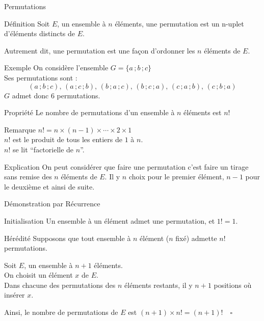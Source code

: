 \documentclass{cours}
\begin{document}
    \begin{Gpartie}{Permutations}
        \begin{Spartie}{Définition}
            Soit $E$, un ensemble à $n$ éléments, une permutation est un n-uplet d'éléments distincts de $E$. \par
            Autrement dit, une permutation est une façon d'ordonner les $n$ éléments de $E$.
            \begin{SSpartie}{Exemple}
                On considère l'ensemble $G=\{a\,;b\,;c\}$ \\ Ses permutations sont :
                \[(a\,;b\,;c),\,(a\,;c\,;b),\,(b\,;a\,;c),\,(b\,;c\,;a),\,(c\,;a\,;b),\,(c\,;b\,;a)\]
                $G$ admet donc 6 permutations.
            \end{SSpartie}
            \begin{SSpartie}{Propriété}
                Le nombre de permutations d'un ensemble à $n$ éléments est $n!$
            \end{SSpartie}
            \begin{SSpartie}{Remarque}
                $n! =n\times(n-1)\times\cdots\times 2\times 1$ \\
                $n!$ est le produit de tous les entiers de $1$ à $n$. \\
                $n!$ se lit ``factorielle de $n$''.
            \end{SSpartie}
            \begin{SSpartie}{Explication}
                On peut considérer que faire une permutation c'est faire un tirage sans remise des $n$ éléments de $E$. Il y $n$ choix pour le premier élément, $n-1$ pour le deuxième et ainsi de suite.
            \end{SSpartie}
            \begin{SSpartie}{Démonstration par Récurrence}
                \begin{SSSpartie}{Initialisation}
                    Un ensemble à un élément admet une permutation, et $1! =1$.
                \end{SSSpartie}
                \begin{SSSpartie}{Hérédité}
                    Supposons que tout ensemble à $n$ élément ($n$ fixé) admette $n!$ permutations. \par
                    Soit $E$, un ensemble à $n+1$ éléments. \\
                    On choisit un élément $x$ de $E$. \\
                    Dans chacune des permutations des $n$ éléments restants, il y $n+1$ positions où insérer $x$. \par
                    Ainsi, le nombre de permutations de $E$ est $(n+1)\times n! =(n+1)!\quad\square$
                \end{SSSpartie}
            \end{SSpartie}
        \end{Spartie}
    \end{Gpartie}
\end{document}
